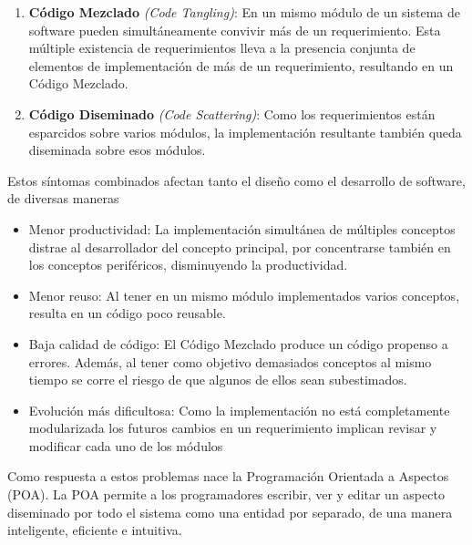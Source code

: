 \begin {enumerate}

	\item {\bf Código Mezclado } \emph{(Code Tangling)}:
	En un mismo módulo de un sistema de software pueden simultáneamente convivir más
	de un requerimiento. Esta múltiple existencia de requerimientos lleva a la
	presencia conjunta de elementos de implementación de más de un
	requerimiento, resultando en un Código Mezclado.
	
	\item {\bf Código Diseminado} \emph{(Code Scattering)}:
	Como los requerimientos están esparcidos sobre varios módulos, la implementación
	resultante también queda diseminada sobre esos módulos.
 
\end{enumerate}

Estos síntomas combinados afectan tanto el diseño como el desarrollo de
software, de diversas maneras

\begin{itemize}
  
	\item Menor productividad: La implementación simultánea de múltiples
	conceptos distrae al desarrollador del concepto principal, por
	concentrarse también en los conceptos periféricos, disminuyendo la
	productividad.
  
  \item Menor reuso: Al tener en un mismo módulo implementados varios
	conceptos, resulta en un código poco reusable.
	
	\item Baja calidad de código: El Código Mezclado produce un código
	propenso a errores. Además, al tener como objetivo demasiados
	conceptos al mismo tiempo se corre el riesgo de que algunos de ellos
	sean subestimados.
	
	\item Evolución más dificultosa: Como la implementación no está
	completamente modularizada los futuros cambios en un
	requerimiento implican revisar y modificar cada uno de los módulos
  
\end{itemize}

Como respuesta a estos problemas nace la Programación Orientada a Aspectos
(POA). La POA permite a los programadores escribir, ver y editar un aspecto
diseminado por todo el sistema como una entidad por separado, de una manera
inteligente, eficiente e intuitiva.\\ \\

